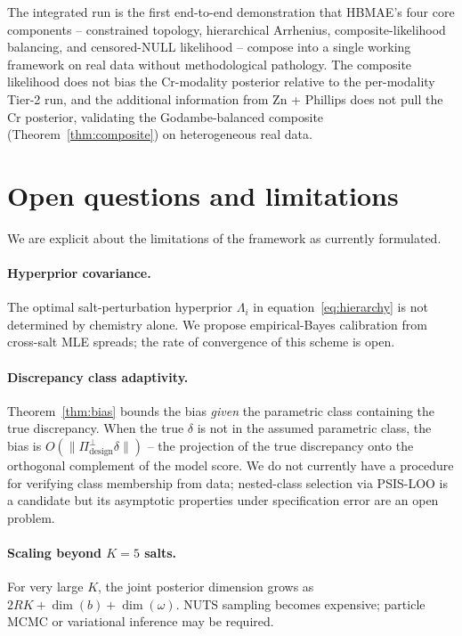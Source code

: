 \documentclass[11pt]{article}
\theoremstyle{definition}
\theoremstyle{remark}
\newcommand{\norm}[1]{\lVert #1 \rVert}
\newcommand{\HBMAE}{HBMAE\xspace}
\begin{document}
The integrated run is the first end-to-end demonstration that \HBMAE's four core
components -- constrained topology, hierarchical Arrhenius, composite-likelihood
balancing, and censored-NULL likelihood -- compose into a single working framework on
real data without methodological pathology. The composite likelihood does not bias the
Cr-modality posterior relative to the per-modality Tier-2 run, and the additional
information from Zn + Phillips does not pull the Cr posterior, validating the
Godambe-balanced composite (Theorem~\ref{thm:composite}) on heterogeneous real data.

\section{Open questions and limitations}\label{sec:limitations}

We are explicit about the limitations of the framework as currently formulated.

\paragraph{Hyperprior covariance.}
The optimal salt-perturbation hyperprior $\Lambda_i$ in equation~\eqref{eq:hierarchy} is not
determined by chemistry alone. We propose empirical-Bayes calibration from cross-salt
MLE spreads; the rate of convergence of this scheme is open.

\paragraph{Discrepancy class adaptivity.}
Theorem~\ref{thm:bias} bounds the bias \emph{given} the parametric class containing the true
discrepancy. When the true $\delta$ is not in the assumed parametric class, the bias is
$O(\norm{\Pi_{\mathrm{design}}^\perp\delta})$ -- the projection of the true discrepancy onto the
orthogonal complement of the model score. We do not currently have a procedure for
verifying class membership from data; nested-class selection via PSIS-LOO is a candidate
but its asymptotic properties under specification error are an open problem.

\paragraph{Scaling beyond $K=5$ salts.}
For very large $K$, the joint posterior dimension grows as $2RK+\dim(b)+\dim(\omega)$.
NUTS sampling becomes expensive; particle MCMC or variational inference may be required.
\end{document}
